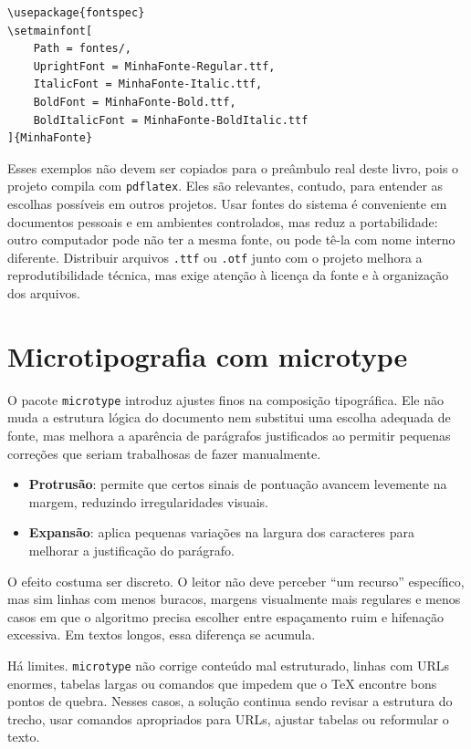 \begin{lstlisting}[language={[latex]TeX}, caption={Arquivos locais de fonte com XeLaTeX ou LuaLaTeX}]
\usepackage{fontspec}
\setmainfont[
    Path = fontes/,
    UprightFont = MinhaFonte-Regular.ttf,
    ItalicFont = MinhaFonte-Italic.ttf,
    BoldFont = MinhaFonte-Bold.ttf,
    BoldItalicFont = MinhaFonte-BoldItalic.ttf
]{MinhaFonte}
\end{lstlisting}

Esses exemplos não devem ser copiados para o preâmbulo real deste livro, pois o projeto compila com \texttt{pdflatex}. Eles são relevantes, contudo, para entender as escolhas possíveis em outros projetos. Usar fontes do sistema é conveniente em documentos pessoais e em ambientes controlados, mas reduz a portabilidade: outro computador pode não ter a mesma fonte, ou pode tê-la com nome interno diferente. Distribuir arquivos \texttt{.ttf} ou \texttt{.otf} junto com o projeto melhora a reprodutibilidade técnica, mas exige atenção à licença da fonte e à organização dos arquivos.

\section{Microtipografia com microtype}

O pacote \texttt{microtype} introduz ajustes finos na composição tipográfica. Ele não muda a estrutura lógica do documento nem substitui uma escolha adequada de fonte, mas melhora a aparência de parágrafos justificados ao permitir pequenas correções que seriam trabalhosas de fazer manualmente.

\begin{itemize}
    \item \textbf{Protrusão}: permite que certos sinais de pontuação avancem levemente na margem, reduzindo irregularidades visuais.
    \item \textbf{Expansão}: aplica pequenas variações na largura dos caracteres para melhorar a justificação do parágrafo.
\end{itemize}

O efeito costuma ser discreto. O leitor não deve perceber ``um recurso'' específico, mas sim linhas com menos buracos, margens visualmente mais regulares e menos casos em que o algoritmo precisa escolher entre espaçamento ruim e hifenação excessiva. Em textos longos, essa diferença se acumula.

Há limites. \texttt{microtype} não corrige conteúdo mal estruturado, linhas com URLs enormes, tabelas largas ou comandos que impedem que o TeX encontre bons pontos de quebra. Nesses casos, a solução continua sendo revisar a estrutura do trecho, usar comandos apropriados para URLs, ajustar tabelas ou reformular o texto.

